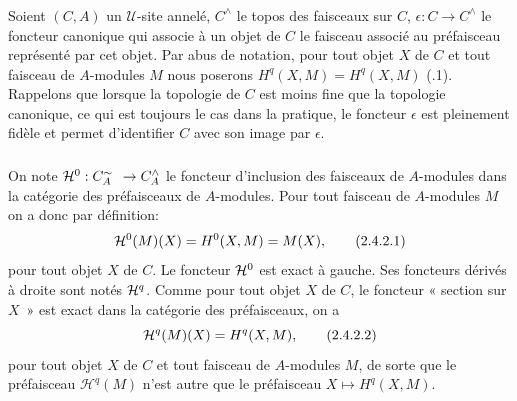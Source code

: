 \documentclass[10pt]{../fichiers-configuration-latex/smfart}
\begin{document}
\subsubsection{}
Soient $(C, A)$ un $𝒰$-site annelé, $C^{\wedge}$ le
topos des faisceaux sur $C$, $\epsilon: C \to
C^{\wedge}$ le foncteur canonique qui associe à un
objet de $C$ le faisceau associé au préfaisceau représenté par
cet objet. Par abus de notation, pour tout objet $X$ de $C$ et tout
faisceau de $A$-modules $M$ nous poserons $H^q(X, M) = H^q(X, M)$ %
(.1). Rappelons que lorsque la topologie de $C$ est moins fine
que la topologie canonique, ce qui est toujours le cas dans la
pratique, le foncteur $\epsilon$ est pleinement fidèle et permet
d'identifier $C$ avec son image par $\epsilon$.

\subsubsection{}
On note $\Hh^0 : C^{\sim{\phantom{a}}}_A \to
C^{\wedge}_A$ le foncteur d'inclusion des faisceaux de
$A$-modules dans la catégorie des préfaisceaux de
$A$-modules. Pour tout faisceau de $A$-modules $M$ on a donc par
définition:
\begin{equation*}
{\mathcal H}^{0}(M)(X) = H^{0}(X, M) = M(X){},\tag{2.4.2.1}
\end{equation*}
pour tout objet $X$ de $C$. Le foncteur ${\mathcal H}^{0}$ est
exact à gauche. Ses foncteurs dérivés à droite sont notés
${\mathcal H}^{q}$. Comme pour tout objet $X$ de $C$, le foncteur «
section sur $X$ » est exact dans la catégorie des préfaisceaux,
on a
\begin{equation*}
\mathcal{H}^q(M)(X) = H^q(X, M){}, \tag{2.4.2.2}
\end{equation*}
pour \pageoriginale tout objet $X$ de $C$ et tout faisceau de
$A$-modules $M$, de sorte que le préfaisceau $\mathcal{H}^q(M)$
n'est autre que le préfaisceau $X \mapsto H^q(X, M)$.
\end{document}

